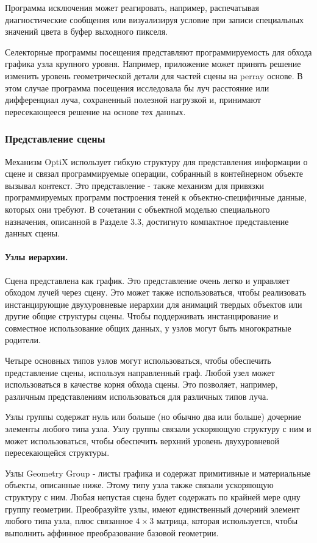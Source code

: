   Программа исключения может реагировать, например, распечатывая диагностические сообщения или визуализируя условие при записи специальных значений цвета в буфер выходного пикселя. 

Селекторные программы посещения представляют программируемость для обхода графика узла крупного уровня. Например, приложение может принять решение изменить уровень геометрической детали для частей сцены на perray основе. В этом случае программа посещения исследовала бы луч
расстояние или дифференциал луча, сохраненный полезной нагрузкой и, принимают пересекающееся решение на основе тех данных.
\subsubsection{Представление сцены}
Механизм OptiX использует гибкую структуру для представления информации о сцене и связал программируемые операции, собранный в контейнерном объекте вызывал контекст. Это представление - также механизм для привязки программируемых программ построения теней к объектно-специфичные данные, которых они требуют. В сочетании с объектной моделью специального назначения, описанной в Разделе 3.3, достигнуто компактное представление данных сцены.
\paragraph{Узлы иерархии.}

Сцена представлена как график. Это представление очень легко и управляет обходом лучей через сцену. Это может также использоваться, чтобы реализовать инстанцирующие двухуровневые иерархии для анимаций твердых объектов или другие общие структуры сцены. Чтобы поддерживать инстанцирование и совместное использование общих данных, у узлов могут быть многократные родители.

Четыре основных типов узлов могут использоваться, чтобы обеспечить представление сцены, используя направленный граф. Любой узел может использоваться в качестве корня обхода сцены. Это позволяет, например, различным представлениям использоваться для различных типов луча. 

Узлы группы содержат нуль или больше (но обычно два или больше) дочерние элементы любого типа узла. Узлу группы связали ускоряющую структуру с ним и может использоваться, чтобы обеспечить верхний уровень двухуровневой пересекающейся структуры.

Узлы Geometry Group - листы графика и содержат примитивные и материальные объекты, описанные ниже. Этому типу узла также связали ускоряющую структуру с ним. Любая непустая сцена будет содержать по крайней мере одну группу геометрии.
Преобразуйте узлы, имеют единственный дочерний элемент любого типа узла, плюс связанное $4\times3$ матрица, которая используется, чтобы выполнить аффинное преобразование базовой геометрии.

